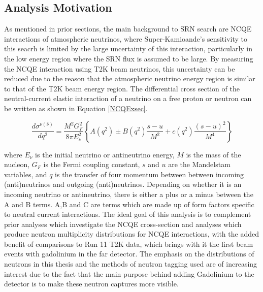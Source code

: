 \subsection{Analysis Motivation}

As mentioned in prior sections, the main background to SRN search are NCQE interactions of atmospheric neutrinos, where Super-Kamioande's sensitivity to this seacrh is limited by the large uncertainty of this interaction, particularly in the low energy region where the SRN flux is assumed to be large. By measuring the NCQE interaction using T2K beam neutrinos, this uncertainty can be reduced due to the reason that the atmospheric neutrino energy region is similar to that of the T2K beam energy region. The differential cross section of the neutral-current elastic interaction of a neutrino on a free proton or neutron can be written as shown in Equation \ref{NCQExsec}. 

\begin{equation}
\frac{d \sigma^{\nu(\bar{\nu})}}{d q^{2}}=\frac{M^{2} G_{F}^{2}}{8 \pi E_{\nu}^{2}}\left\{A\left(q^{2}\right) \pm B\left(q^{2}\right) \frac{s-u}{M^{2}}+c\left(q^{2}\right) \frac{(s-u)^{2}}{M^{4}}\right\}
\label{NCQExsec}
\end{equation}
    
where $E_{\nu}$ is the initial neutrino or antineutrino energy, $M$ is the mass of the nucleon, $G_{F}$ is the Fermi coupling constant, $s$ and $u$ are the Mandelstam variables, and $q$ is the transfer of four momentum between between incoming (anti)neutrinos and outgoing (anti)neutrinos. Depending on whether it is an incoming neutrino or antineutrino, there is either a plus or a minus between the A and B terms. A,B and C are terms which are made up of form factors specific to neutral current interactions. The ideal goal of this analysis is to complement prior analyses which investigate the NCQE cross-section and analyses which produce neutron multiplicity distributions for NCQE interactions, with the added benefit of comparisons to Run 11 T2K data, which brings with it the first beam events with gadolinium in the far detector. The emphasis on the distributions of neutrons in this thesis and the methods of neutron tagging used are of increasing interest due to the fact that the main purpose behind adding Gadolinium to the detector is to make these neutron captures more visible. 


